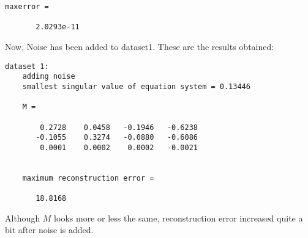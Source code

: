\documentclass[11pt]{article}
\begin{document}
\begin{enumerate}
\begin{itemize}
\begin{Verbatim}[frame=single]
	maxerror =

	   2.0293e-11
	\end{Verbatim}

	Now, Noise has been added to dataset1. These are the results obtained: 
	\begin{Verbatim}[frame=single]
	dataset 1: 
	adding noise
	smallest singular value of equation system = 0.13446

	M =

	    0.2728    0.0458   -0.1946   -0.6238
	   -0.1055    0.3274   -0.0880   -0.6086
	    0.0001    0.0002    0.0002   -0.0021


	maximum reconstruction error =

	   18.8168
	\end{Verbatim}

	Although $M$ looks more or less the same, reconstruction error increased quite a bit after noise is added.


\end{itemize}
\end{enumerate}
\end{document}
